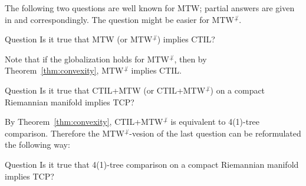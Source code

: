 The following two questions are well known for MTW;
partial answers are given in \cite{MTW+CTIL+} and \cite{loeper} correspondingly.
The question might be easier for MTW$^{\not\perp}$.

\begin{thm}{Question}
Is it true that MTW (or MTW$^{\not\perp}$) implies CTIL?
\end{thm}

Note that if the globalization holds for MTW$^{\not\perp}$, then by Theorem~\ref{thm:convexity}, MTW$^{\not\perp}$ implies CTIL.

\begin{thm}{Question}
Is it true that CTIL+MTW (or CTIL+MTW$^{\not\perp}$) on a compact Riemannian manifold implies TCP?
\end{thm}

By Theorem~\ref{thm:convexity}, CTIL+MTW$^{\not\perp}$ is equivalent to 4(1)-tree comparison. 
Therefore the MTW$^{\not\perp}$-vesion of the last question can be reformulated the following way:

\begin{thm}{Question} Is it true that 4(1)-tree comparison on a compact Riemannian manifold implies TCP?
\end{thm}


